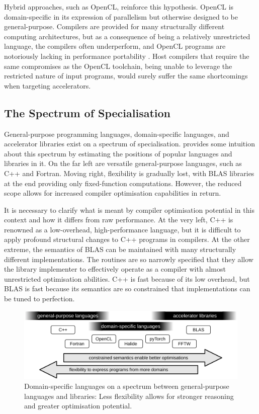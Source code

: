     Hybrid approaches, such as OpenCL, reinforce this hypothesis.
    OpenCL is domain-specific in its expression of parallelism but otherwise
    designed to be general-purpose.
    Compilers are provided for many structurally different computing
    architectures, but as a consequence of being a relatively unrestricted
    language, the compilers often underperform, and OpenCL programs are
    notoriously lacking in performance portability
    \citep{Falch:2015:MLB:2863697.2864570}.
    Host compilers that require the same compromises as the OpenCL toolchain,
    being unable to leverage the restricted nature of input programs, would
    surely suffer the same shortcomings when targeting accelerators.

\subsection{The Spectrum of Specialisation}

    General-purpose programming languages, domain-specific languages, and
    accelerator libraries exist on a spectrum of specialisation.
     provides some intuition about this spectrum by
    estimating the positions of popular languages and libraries in it.
    On the far left are versatile general-purpose languages, such as C++ and
    Fortran.
    Moving right, flexibility is gradually lost, with BLAS libraries at
    the end providing only fixed-function computations.
    However, the reduced scope allows for increased compiler optimisation
    capabilities in return.

    It is necessary to clarify what is meant by compiler optimisation potential
    in this context and how it differs from raw performance.
    At the very left, C++ is renowned as a low-overhead, high-performance
    language, but it is difficult to apply profound structural changes to C++
    programs in compilers.
    At the other extreme, the semantics of BLAS can be maintained with many
    structurally different implementations.
    The routines are so narrowly specified that they allow the library
    implementer to effectively operate as a compiler with almost
    unrestricted optimisation abilities.
    C++ is fast because of its low overhead, but BLAS is fast because
    its semantics are so constrained that implementations can be tuned to
    perfection.

\begin{figure}[t]
\centering
\includegraphics[width=\textwidth]{figures/DSLgradient}
\caption{Domain-specific languages on a spectrum between general-purpose
         languages and libraries:
         Less flexibility allows for stronger reasoning and greater
         optimisation potential.}
\label{specialgradient}
\end{figure}

